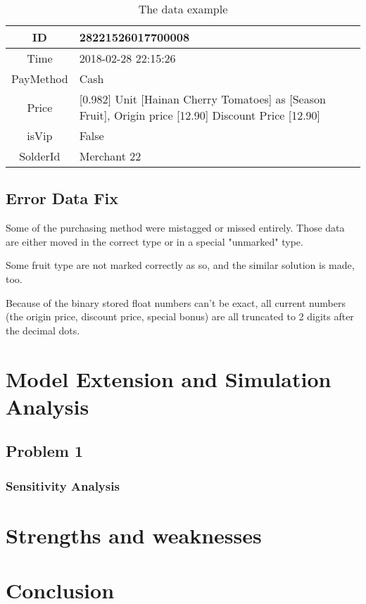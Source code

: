 \documentclass{mcmthesis}
\begin{document}
\begin{table}[h]
	\centering
	\caption{The data example} \label{table-data_example}
	\begin{tabular}{|c|p{20em}|}
		\hline
		ID & 28221526017700008\\
		\hline
		Time & 2018-02-28 22:15:26\\
		\hline
		PayMethod & Cash\\
		\hline
		Price & [0.982] Unit [Hainan Cherry Tomatoes] as [Season Fruit], Origin price [12.90] Discount Price [12.90]\\
		\hline
		isVip & False\\
		\hline
		SolderId & Merchant 22\\
		\hline
	\end{tabular}
\end{table}

\subsection{Error Data Fix}

Some of the purchasing method were mistagged or missed entirely. Those data are either moved in the correct type or in a special "unmarked" type.

Some fruit type are not marked correctly as so, and the similar solution is made, too.

Because of the binary stored float numbers can't be exact, all current numbers (the origin price, discount price, special bonus) are all truncated to 2 digits after the decimal dots.
\section{Model Extension and Simulation Analysis}
\subsection{Problem 1}

\subsubsection{Sensitivity Analysis}

\section{Strengths and weaknesses}

\section{Conclusion}
\end{document}
